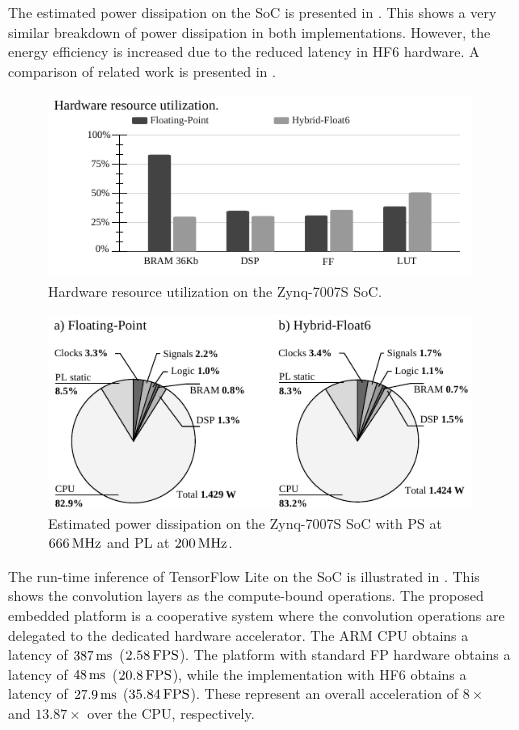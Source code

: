 The estimated power dissipation on the SoC is presented in . This shows a very similar breakdown of power dissipation in both implementations. However, the energy efficiency is increased due to the reduced latency in HF6 hardware. A comparison of related work is presented in .

\begin{figure}[h!]
	\centering
	\includegraphics[width=1\columnwidth]{../figures/power_breakdown/resource_utilization.pdf}
	\caption{Hardware resource utilization on the Zynq-7007S SoC.}
	\label{fig:resource_utilization}
\end{figure}

\begin{figure}[h!]
	\centering
	\includegraphics[width=1\columnwidth]{../figures/power_breakdown/power_breakdown.pdf}
	\caption{Estimated power dissipation on the Zynq-7007S SoC with PS at $\unit[666]{MHz}$ and PL at $\unit[200]{MHz}$.}
	\label{fig:power}
\end{figure}

The run-time inference of TensorFlow Lite on the SoC is illustrated in . This shows the convolution layers as the compute-bound operations. The proposed embedded platform is a cooperative system where the convolution operations are delegated to the dedicated hardware accelerator. The ARM CPU obtains a latency of $\unit[387]{ms}$ ($\unit[2.58]{FPS}$). The platform with standard FP hardware obtains a latency of $\unit[48]{ms}$ ($\unit[20.8]{FPS}$), while the implementation with HF6 obtains a latency of $\unit[27.9]{ms}$ ($\unit[35.84]{FPS}$). These represent an overall acceleration of $8\times$ and $13.87\times$ over the CPU, respectively.

